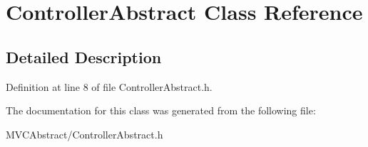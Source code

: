 \hypertarget{classControllerAbstract}{}\section{Controller\+Abstract Class Reference}
\label{classControllerAbstract}


\subsection{Detailed Description}


Definition at line 8 of file Controller\+Abstract.\+h.



The documentation for this class was generated from the following file\+:\begin{DoxyCompactItemize}
\item 
M\+V\+C\+Abstract/Controller\+Abstract.\+h\end{DoxyCompactItemize}
